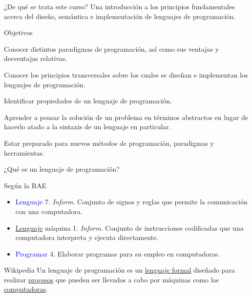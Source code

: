 \documentclass{beamer} %
\newcommand{\blue}[1]{\textcolor{blue}{#1}}
\begin{document}
\begin{frame}{¿De qué se trata este curso?}
    Una introducción a los principios fundamentales acerca del diseño, semántica e implementación de lenguajes de programación.
    \begin{block}{Objetivos}
      \begin{itemize}\small{
        \item Conocer distintos paradigmas de programación, así como sus ventajas y desventajas relativas.
        \item Conocer los principios transversales sobre los cuales se diseñan e implementan los lenguajes de programación.
        \item Identificar propiedades de un lenguaje de programación.
        \item Aprender a pensar la solución de un problema en términos abstractos en lugar de hacerlo atado a la sintaxis de un lenguaje en particular.
        \item Estar preparado para nuevos métodos de programación, paradigmas y herramientas.}
      \end{itemize}
    \end{block}
\end{frame}

\begin{frame}{¿Qué es un lenguaje de programación?}
    \begin{block}{Según la RAE}
      \begin{itemize}
        \item \blue{Lenguaje} 7. \textit{Inform}. Conjunto de signos y reglas que permite la comunicación con una computadora.
        \item \alert{\underline{Lenguaje} máquina} 1. \textit{Inform}. Conjunto de instrucciones codificadas que una computadora interpreta y ejecuta directamente.
        \item \blue{Programar} 4. Elaborar programas para su empleo en computadoras.
      \end{itemize}
    \end{block}
    \pause
    \begin{block}{Wikipedia}
    Un lenguaje de programación es un \underline{lenguaje formal} diseñado para realizar \underline{procesos} que pueden ser llevados a cabo por máquinas como las \underline{computadoras}.
    \end{block}
\end{frame}
\end{document}
